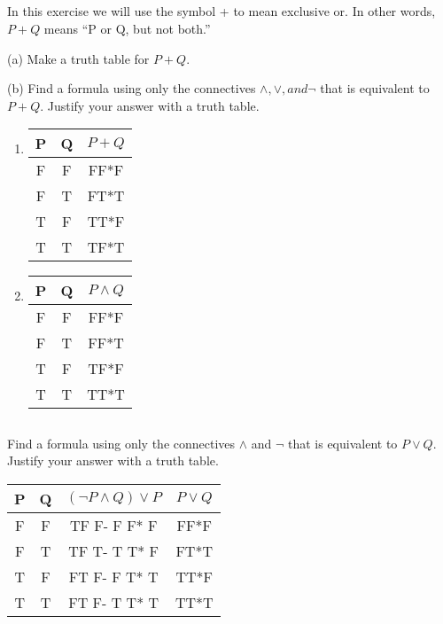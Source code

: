 \documentclass{article}
\begin{document}
\subsection{}
In this exercise we will use the symbol + to mean exclusive or. In
other words, $P + Q$ means “P or Q, but not both.”

(a) Make a truth table for $P + Q.$

(b) Find a formula using only the connectives $\land, \lor, and  \neg$ that is equivalent to $P + Q$. Justify your answer with a truth table.
\begin{enumerate}[label=(\alph*)]
  \item 
\begin{center}
 \begin{tabular}{||c c c ||} 
 \hline
 P & Q & $P + Q$ \\ [0.5ex] 
 \hline\hline
 F & F & FF*F\\ 
 \hline
 F & T & FT*T\\
 \hline
 T & F & TT*F\\
 \hline
 T & T & TF*T\\ [1ex] 
 \hline
\end{tabular}
\end{center}
\item
\begin{center}
 \begin{tabular}{||c c c ||} 
 \hline
 P & Q & $P \land Q$ \\ [0.5ex] 
 \hline\hline
 F & F & FF*F\\ 
 \hline
 F & T & FF*T\\
 \hline
 T & F & TF*F\\
 \hline
 T & T & TT*T\\ [1ex] 
 \hline
\end{tabular}
\end{center}
\end{enumerate}
\subsection{}
Find a formula using only the connectives $\land$ and $\neg$ that is equivalent
to $P \lor Q$. Justify your answer with a truth table.
\begin{center}
 \begin{tabular}{||c c c c ||} 
 \hline
 P & Q & $(\neg P \land Q ) \lor P$ & $ P \lor Q $\\ [0.5ex] 
 \hline\hline
 F & F &TF F- F F* F & FF*F\\ 
 \hline
 F & T &TF T- T T* F & FT*T\\
 \hline
 T & F &FT F- F T* T & TT*F\\
 \hline
 T & T &FT F- T T* T & TT*T\\ [1ex] 
 \hline
\end{tabular}
\end{center}
\end{document}
